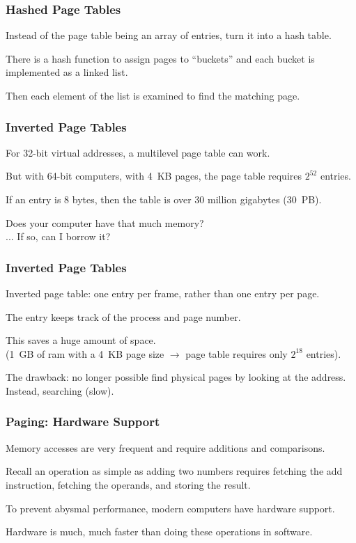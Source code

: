 \begin{frame}
\frametitle{Hashed Page Tables}

Instead of the page table being an array of entries, turn it into a hash table.

There is a hash function to assign pages to ``buckets'' and each bucket is implemented as a linked list. 
 
Then each element of the list is examined to find the matching page.

\end{frame}

\begin{frame}
\frametitle{Inverted Page Tables}

For 32-bit virtual addresses, a multilevel page table can work. 

But with 64-bit computers, with 4~KB pages, the page table requires $2^{52}$ entries.

If an entry is 8 bytes, then the table is over 30 million gigabytes (30~PB).

Does your computer have that much memory?\\
\quad ... If so, can I borrow it?

\end{frame}

\begin{frame}
\frametitle{Inverted Page Tables}

Inverted page table: one entry per frame, rather than one entry per page.

The entry keeps track of the process and page number. 

This saves a huge amount of space.\\
\quad (1~GB of ram with a 4~KB page size $\rightarrow$ page table requires only $2^{18}$ entries).

The drawback: no longer possible find physical pages by looking at the address.\\
\quad Instead, searching (slow).

\end{frame}

\begin{frame}
\frametitle{Paging: Hardware Support}

Memory accesses are very frequent and require additions and comparisons. 

Recall an operation as simple as adding two numbers requires fetching the add instruction, fetching the operands, and storing the result. 

To prevent abysmal performance, modern computers have hardware support.

Hardware is much, much faster than doing these operations in software.



\end{frame}

